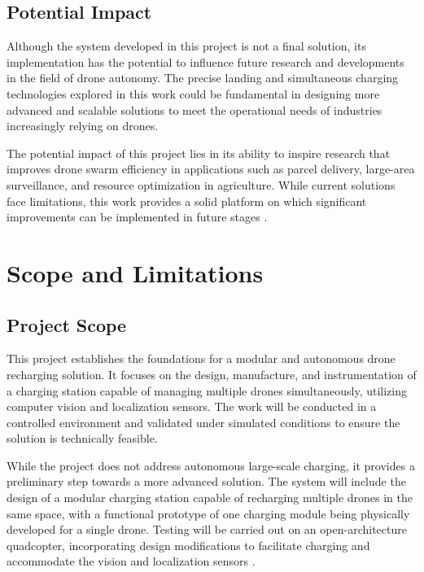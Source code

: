 \subsection{Potential Impact}

Although the system developed in this project is not a final solution, its implementation has the potential to influence future research and developments in the field of drone autonomy. The precise landing and simultaneous charging technologies explored in this work could be fundamental in designing more advanced and scalable solutions to meet the operational needs of industries increasingly relying on drones.

The potential impact of this project lies in its ability to inspire research that improves drone swarm efficiency in applications such as parcel delivery, large-area surveillance, and resource optimization in agriculture. While current solutions face limitations, this work provides a solid platform on which significant improvements can be implemented in future stages \cite{bene2023}.

\section{Scope and Limitations}

\subsection{Project Scope}

This project establishes the foundations for a modular and autonomous drone recharging solution. It focuses on the design, manufacture, and instrumentation of a charging station capable of managing multiple drones simultaneously, utilizing computer vision and localization sensors. The work will be conducted in a controlled environment and validated under simulated conditions to ensure the solution is technically feasible.

While the project does not address autonomous large-scale charging, it provides a preliminary step towards a more advanced solution. The system will include the design of a modular charging station capable of recharging multiple drones in the same space, with a functional prototype of one charging module being physically developed for a single drone. Testing will be carried out on an open-architecture quadcopter, incorporating design modifications to facilitate charging and accommodate the vision and localization sensors \cite{desilva2022}.

